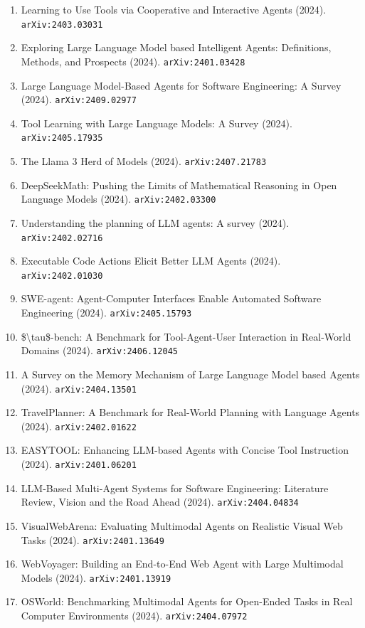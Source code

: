\documentclass[11pt]{article}
\begin{document}
\begin{enumerate}
  \item Learning to Use Tools via Cooperative and Interactive Agents (2024). \texttt{arXiv:2403.03031}
  \item Exploring Large Language Model based Intelligent Agents: Definitions,
  Methods, and Prospects (2024). \texttt{arXiv:2401.03428}
  \item Large Language Model-Based Agents for Software Engineering: A Survey (2024). \texttt{arXiv:2409.02977}
  \item Tool Learning with Large Language Models: A Survey (2024). \texttt{arXiv:2405.17935}
  \item The Llama 3 Herd of Models (2024). \texttt{arXiv:2407.21783}
  \item DeepSeekMath: Pushing the Limits of Mathematical Reasoning in Open
  Language Models (2024). \texttt{arXiv:2402.03300}
  \item Understanding the planning of LLM agents: A survey (2024). \texttt{arXiv:2402.02716}
  \item Executable Code Actions Elicit Better LLM Agents (2024). \texttt{arXiv:2402.01030}
  \item SWE-agent: Agent-Computer Interfaces Enable Automated Software
  Engineering (2024). \texttt{arXiv:2405.15793}
  \item \$\textbackslash{}tau\$-bench: A Benchmark for Tool-Agent-User Interaction in Real-World
  Domains (2024). \texttt{arXiv:2406.12045}
  \item A Survey on the Memory Mechanism of Large Language Model based Agents (2024). \texttt{arXiv:2404.13501}
  \item TravelPlanner: A Benchmark for Real-World Planning with Language Agents (2024). \texttt{arXiv:2402.01622}
  \item EASYTOOL: Enhancing LLM-based Agents with Concise Tool Instruction (2024). \texttt{arXiv:2401.06201}
  \item LLM-Based Multi-Agent Systems for Software Engineering: Literature Review, Vision and the Road Ahead (2024). \texttt{arXiv:2404.04834}
  \item VisualWebArena: Evaluating Multimodal Agents on Realistic Visual Web
  Tasks (2024). \texttt{arXiv:2401.13649}
  \item WebVoyager: Building an End-to-End Web Agent with Large Multimodal
  Models (2024). \texttt{arXiv:2401.13919}
  \item OSWorld: Benchmarking Multimodal Agents for Open-Ended Tasks in Real
  Computer Environments (2024). \texttt{arXiv:2404.07972}

\end{enumerate}
\end{document}
